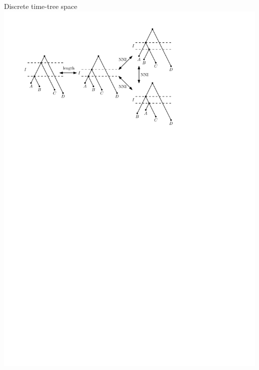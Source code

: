 \documentclass{beamer}
\theoremstyle{example}
\begin{document}
\begin{frame}
\begin{block}{Discrete time-tree space}
\includegraphics[width=\framewidth]{DtT}
\end{block}
\end{frame}
\end{document}
